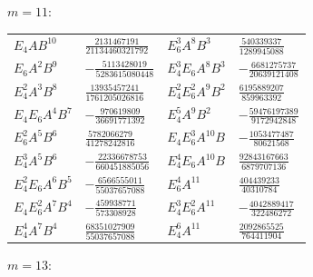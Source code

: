 \documentclass[11pt]{amsart}
\theoremstyle{definition}
\begin{document}
\noindent$m=11$:\nopagebreak\\[2pt]
{\small\begin{tabular}{@{}l@{\ \ }l@{\qquad}l@{\ \ }l@{}}
$E_4 A B^{10}$ & $\tfrac{2131467191}{21134460321792}$ & $E_6^{3} A^{8} B^{3}$ & $\tfrac{540339337}{1289945088}$ \\
$E_6 A^{2} B^{9}$ & $-\tfrac{5113428019}{5283615080448}$ & $E_4^{3} E_6 A^{8} B^{3}$ & $-\tfrac{6681275737}{20639121408}$ \\
$E_4^{2} A^{3} B^{8}$ & $\tfrac{13935457241}{1761205026816}$ & $E_4^{2} E_6^{2} A^{9} B^{2}$ & $\tfrac{6195889207}{859963392}$ \\
$E_4 E_6 A^{4} B^{7}$ & $-\tfrac{970619809}{36691771392}$ & $E_4^{5} A^{9} B^{2}$ & $-\tfrac{59476197389}{9172942848}$ \\
$E_6^{2} A^{5} B^{6}$ & $\tfrac{5782066279}{41278242816}$ & $E_4 E_6^{3} A^{10} B$ & $-\tfrac{1053477487}{80621568}$ \\
$E_4^{3} A^{5} B^{6}$ & $-\tfrac{22336678753}{660451885056}$ & $E_4^{4} E_6 A^{10} B$ & $\tfrac{92843167663}{6879707136}$ \\
$E_4^{2} E_6 A^{6} B^{5}$ & $-\tfrac{6566555011}{55037657088}$ & $E_6^{4} A^{11}$ & $\tfrac{404439233}{40310784}$ \\
$E_4 E_6^{2} A^{7} B^{4}$ & $-\tfrac{459938771}{573308928}$ & $E_4^{3} E_6^{2} A^{11}$ & $-\tfrac{4042889417}{322486272}$ \\
$E_4^{4} A^{7} B^{4}$ & $\tfrac{68351027909}{55037657088}$ & $E_4^{6} A^{11}$ & $\tfrac{2092865525}{764411904}$ \\
\end{tabular}}\par\medskip
\noindent$m=13$:\nopagebreak\\[2pt]
\end{document}
